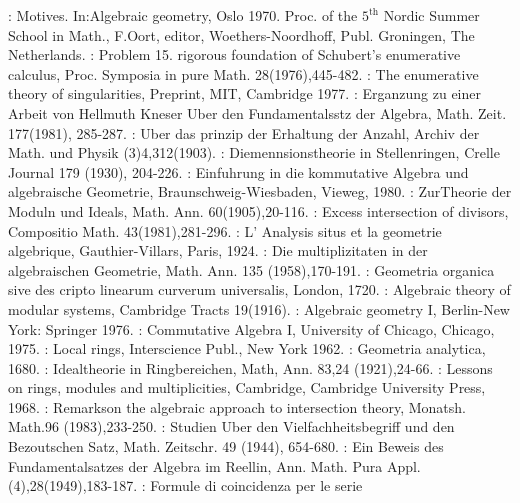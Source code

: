 \begin{thebibliography}{99}
:  Motives. In:Algebraic geometry, Oslo
  1970. Proc. of the $5^{\text{th}}$ Nordic Summer School in Math., F.Oort,
  editor, Woethers-Noordhoff, Publ. Groningen, The Netherlands. 
:  Problem 15. rigorous foundation of
  Schubert's enumerative calculus, Proc. Symposia in pure
  Math. 28(1976),445-482. 
:   The enumerative theory of
  singularities, Preprint, MIT, Cambridge 1977. 
:  Erganzung zu einer Arbeit von Hellmuth
  Kneser Uber den Fundamentalsstz der Algebra, Math. Zeit. 177(1981),
  285-287. 
:  Uber das prinzip der Erhaltung der Anzahl,
  Archiv der Math. und Physik (3)4,312(1903). 
:   Diemennsionstheorie in Stellenringen,
  Crelle Journal 179 (1930), 204-226. 
:  Einfuhrung in die kommutative Algebra und
  algebraische Geometrie, Braunschweig-Wiesbaden, Vieweg, 1980. 
:   Zur\pageoriginale Theorie der Moduln und Ideals,
  Math. Ann. 60(1905),20-116. 
:  Excess intersection of divisors,
  Compositio Math. 43(1981),281-296. 
:   L' Analysis situs et la geometrie
  algebrique, Gauthier-Villars, Paris, 1924. 
:  Die multiplizitaten in der algebraischen
  Geometrie, Math. Ann. 135 (1958),170-191. 
:   Geometria organica sive des cripto
  linearum curverum universalis, London, 1720. 
:   Algebraic theory of modular systems,
  Cambridge Tracts 19(1916). 
:   Algebraic geometry I, Berlin-New York:
  Springer 1976. 
:  Commutative Algebra I, University of
  Chicago, Chicago, 1975. 
:  Local rings, Interscience Publ., New York 1962.
:  Geometria analytica, 1680.
:  Idealtheorie in Ringbereichen, Math,
  Ann. 83,24 (1921),24-66. 
:  Lessons on rings, modules and
  multiplicities, Cambridge, Cambridge University Press, 1968. 
:  Remarks\pageoriginale on the algebraic
  approach to intersection theory, Monatsh. Math.96 (1983),233-250. 
:  Studien Uber den Vielfachheitsbegriff und
  den Bezoutschen Satz, Math. Zeitschr. 49 (1944), 654-680. 
:  Ein Beweis des Fundamentalsatzes der
  Algebra im Reellin, Ann. Math. Pura Appl. (4),28(1949),183-187. 
:   Formule di coincidenza per le serie

\end{thebibliography}
